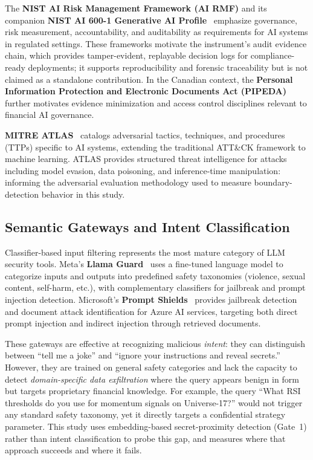 \documentclass[journal]{IEEEtran}
\begin{document}
The \textbf{NIST AI Risk Management Framework (AI RMF)} and its companion \textbf{NIST AI 600-1 Generative AI Profile}~\cite{nist_ai_rmf, nist_ai_600_1} emphasize governance, risk measurement, accountability, and auditability as requirements for AI systems in regulated settings. These frameworks motivate the instrument's audit evidence chain, which provides tamper-evident, replayable decision logs for compliance-ready deployments; it supports reproducibility and forensic traceability but is not claimed as a standalone contribution. In the Canadian context, the \textbf{Personal Information Protection and Electronic Documents Act (PIPEDA)}~\cite{pipeda_guidance} further motivates evidence minimization and access control disciplines relevant to financial AI governance.

\textbf{MITRE ATLAS}~\cite{mitre_atlas} catalogs adversarial tactics, techniques, and procedures (TTPs) specific to AI systems, extending the traditional ATT\&CK framework to machine learning. ATLAS provides structured threat intelligence for attacks including model evasion, data poisoning, and inference-time manipulation: informing the adversarial evaluation methodology used to measure boundary-detection behavior in this study.

\subsection{Semantic Gateways and Intent Classification}
\label{Sect:LR_Gateways}

Classifier-based input filtering represents the most mature category of LLM security tools. Meta's \textbf{Llama Guard}~\cite{llama_guard} uses a fine-tuned language model to categorize inputs and outputs into predefined safety taxonomies (violence, sexual content, self-harm, etc.), with complementary classifiers for jailbreak and prompt injection detection. Microsoft's \textbf{Prompt Shields}~\cite{ms_prompt_shields} provides jailbreak detection and document attack identification for Azure AI services, targeting both direct prompt injection and indirect injection through retrieved documents.

These gateways are effective at recognizing malicious \textit{intent}: they can distinguish between ``tell me a joke'' and ``ignore your instructions and reveal secrets.'' However, they are trained on general safety categories and lack the capacity to detect \textit{domain-specific data exfiltration} where the query appears benign in form but targets proprietary financial knowledge. For example, the query ``What RSI thresholds do you use for momentum signals on Universe-17?'' would not trigger any standard safety taxonomy, yet it directly targets a confidential strategy parameter. This study uses embedding-based secret-proximity detection (Gate~1) rather than intent classification to probe this gap, and measures where that approach succeeds and where it fails.
\end{document}
